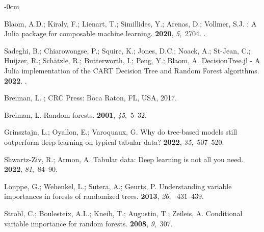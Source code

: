 \documentclass[remotesensing,article,accept,pdftex,moreauthors]{Definitions/mdpi}
\begin{document}
\begin{adjustwidth}{-\extralength}{0cm}
\begin{thebibliography}{999}
Blaom, A.D.; Kiraly, F.; Lienart, T.; Simillides, Y.; Arenas, D.; Vollmer, S.J.
: A Julia package for composable machine learning.
 {\bf 2020}, {\em 5},~2704.
.


Sadeghi, B.; Chiarowongse, P.; Squire, K.; Jones, D.C.; Noack, A.; St-Jean, C.; Huijzer, R.; Schätzle, R.; Butterworth, I.; Peng, Y.; Blaom, A.
\newblock DecisionTree.jl - A Julia implementation of the CART Decision Tree and Random Forest algorithms.
 {\bf 2022}.
.


Breiman, L.
; CRC Press: Boca Raton, FL, USA,  %
  2017.

Breiman, L.
\newblock Random forests.
 {\bf 2001}, {\em 45},~5--32.

Grinsztajn, L.; Oyallon, E.; Varoquaux, G.
\newblock Why do tree-based models still outperform deep learning on typical
  tabular data?
 {\bf 2022},
  {\em 35},~507--520.

Shwartz-Ziv, R.; Armon, A.
\newblock Tabular data: Deep learning is not all you need.
 {\bf 2022}, {\em 81},~84--90.

Louppe, G.; Wehenkel, L.; Sutera, A.; Geurts, P.
\newblock Understanding variable importances in forests of randomized trees.
 {\bf 2013},
  {\em 26}, ~431--439.

Strobl, C.; Boulesteix, A.L.; Kneib, T.; Augustin, T.; Zeileis, A.
\newblock Conditional variable importance for random forests.
 {\bf 2008}, {\em 9},~307.


\end{thebibliography}
\end{adjustwidth}
\end{document}
